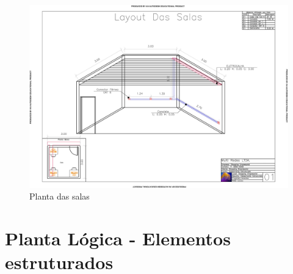 \documentclass[	DIV=calc,%
							paper=a4,%
							fontsize=12pt,%
							onecolumn]{scrartcl}	 					%
\begin{document}
\begin{figure}
\centering
\includegraphics[width=\textwidth]{L2}
\caption{Planta das salas}
\label{L2}
\end{figure}

\section{Planta Lógica - Elementos estruturados}
\end{document}

